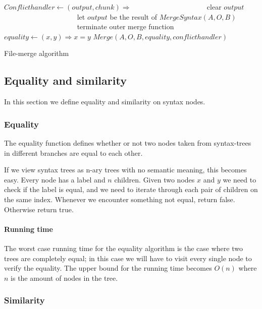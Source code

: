 \documentclass[11pt]{article}
\begin{document}
\begin{algorithm}
\begin{algorithmic}
   \State $Conflicthandler \gets (output, chunk) \Rightarrow$
      \State ~~~~~~~~~~~~~~~~~~~~ clear $output$
      \State ~~~~~~~~~~~~~~~~~~~~ let $output$ be the result of $MergeSyntax(A, O, B)$
      \State ~~~~~~~~~~~~~~~~~~~~ terminate outer merge function
	\State $equality \gets (x, y) \Rightarrow x = y$
	\State \Return $Merge(A, O, B, equality, conflicthandler)$
\EndFunction
\end{algorithmic}
\caption{File-merge algorithm}
  \label{Mainmerge}
\end{algorithm}

\subsection{Equality and similarity}
In this section we define equality and similarity on syntax nodes.

\subsubsection{Equality}
The equality function defines whether or not two nodes taken from syntax-trees in different branches are equal to each other.

If we view syntax trees as n-ary trees with no semantic meaning, this becomes easy. Every node has a label and $n$ children. Given two nodes $x$ and $y$ we need to check if the label is equal, and we need to iterate through each pair of children on the same index. Whenever we encounter something not equal, return false. Otherwise return true.

\paragraph{Running time} The worst case running time for the equality algorithm is the case where two trees are completely equal; in this case we will have to visit every single node to verify the equality. The upper bound for the running time becomes $O(n)$ where $n$ is the amount of nodes in the tree.

\subsubsection{Similarity}
\label{FunctionSimilarity}
\end{document}
